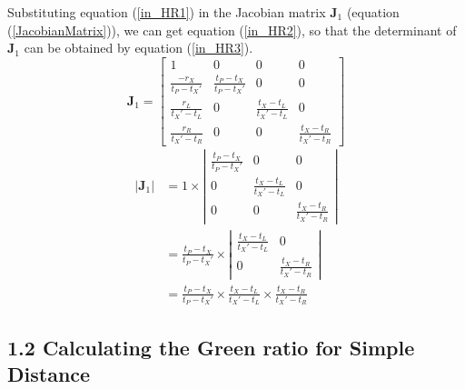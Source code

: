\documentclass{bmcart}
\begin{document}
\begin{backmatter}
Substituting equation (\ref{in_HR1}) in the Jacobian matrix ${{\mathbf{J}}_1}$ (equation (\ref{JacobianMatrix})), we can get equation (\ref{in_HR2}), so that the determinant of ${{\mathbf{J}}_1}$ can be obtained by equation (\ref{in_HR3}).
\begin{equation}\label{in_HR2}
{{\mathbf{J}}_1} = \left[ {\begin{array}{*{20}{c}}
  1&0&0&0 \\
  {\frac{{ - {r_X}}}{{{t_P} - {t_X}'}}}&{\frac{{{t_P} - {t_X}}}{{{t_P} - {t_X}'}}}&0&0 \\
  {\frac{{{r_L}}}{{{t_X}' - {t_L}}}}&0&{\frac{{{t_X} - {t_L}}}{{{t_X}' - {t_L}}}}&0 \\
  {\frac{{{r_R}}}{{{t_X}' - {t_R}}}}&0&0&{\frac{{{t_X} - {t_R}}}{{{t_X}' - {t_R}}}}
\end{array}} \right]
\end{equation}
\begin{equation}\label{in_HR3}
\begin{aligned}
\left| {{{\mathbf{J}}_1}} \right| &= 1 \times \left| {\begin{array}{*{20}{c}}
  {\frac{{{t_P} - {t_X}}}{{{t_P} - {t_X}'}}}&0&0 \\
  0&{\frac{{{t_X} - {t_L}}}{{{t_X}' - {t_L}}}}&0 \\
  0&0&{\frac{{{t_X} - {t_R}}}{{{t_X}' - {t_R}}}}
\end{array}} \right| \\&= \frac{{{t_P} - {t_X}}}{{{t_P} - {t_X}'}} \times \left| {\begin{array}{*{20}{c}}
  {\frac{{{t_X} - {t_L}}}{{{t_X}' - {t_L}}}}&0 \\
  0&{\frac{{{t_X} - {t_R}}}{{{t_X}' - {t_R}}}}
\end{array}} \right| \\&= \frac{{{t_P} - {t_X}}}{{{t_P} - {t_X}'}} \times \frac{{{t_X} - {t_L}}}{{{t_X}' - {t_L}}} \times \frac{{{t_X} - {t_R}}}{{{t_X}' - {t_R}}}
\end{aligned}
\end{equation}

\subsection*{1.2 Calculating the Green ratio for Simple Distance}


\end{backmatter}
\end{document}
